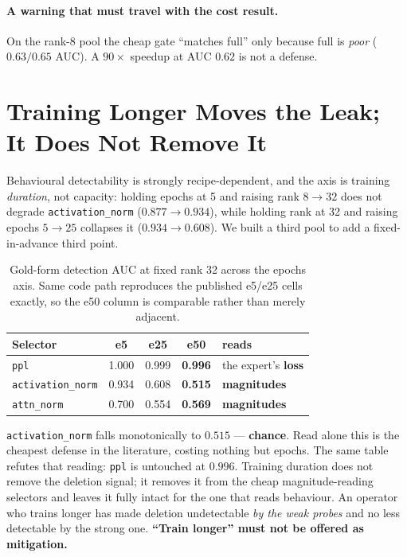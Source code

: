 \documentclass[11pt]{article}
\begin{document}
\paragraph{A warning that must travel with the cost result.} On the rank-8 pool the cheap gate
``matches full'' only because full is \emph{poor} ($0.63/0.65$ AUC). A $90\times$ speedup at AUC
$0.62$ is not a defense.

\section{Training Longer Moves the Leak; It Does Not Remove It}
\label{sec:duration}

Behavioural detectability is strongly recipe-dependent, and the axis is training \emph{duration},
not capacity: holding epochs at 5 and raising rank $8 \to 32$ does not degrade
\texttt{activation\_norm} ($0.877 \to 0.934$), while holding rank at 32 and raising epochs $5 \to 25$
collapses it ($0.934 \to 0.608$). We built a third pool to add a fixed-in-advance third point.

\begin{table}[t]
\centering
\begin{tabular}{@{}lcccl@{}}
\toprule
Selector & e5 & e25 & \textbf{e50} & reads \\
\midrule
\texttt{ppl}             & 1.000 & 0.999 & \textbf{0.996} & the expert's \textbf{loss} \\
\texttt{activation\_norm}& 0.934 & 0.608 & \textbf{0.515} & \textbf{magnitudes} \\
\texttt{attn\_norm}      & 0.700 & 0.554 & \textbf{0.569} & \textbf{magnitudes} \\
\bottomrule
\end{tabular}
\caption{Gold-form detection AUC at fixed rank 32 across the epochs axis. Same code path reproduces
the published e5/e25 cells exactly, so the e50 column is comparable rather than merely adjacent.}
\label{tab:epochs}
\end{table}

\texttt{activation\_norm} falls monotonically to $0.515$ --- \textbf{chance}. Read alone this is the
cheapest defense in the literature, costing nothing but epochs. The same table refutes that reading:
\texttt{ppl} is untouched at $0.996$. Training duration does not remove the deletion signal; it
removes it from the cheap magnitude-reading selectors and leaves it fully intact for the one that
reads behaviour. An operator who trains longer has made deletion undetectable \emph{by the weak
probes} and no less detectable by the strong one. \textbf{``Train longer'' must not be offered as
mitigation.}
\end{document}
